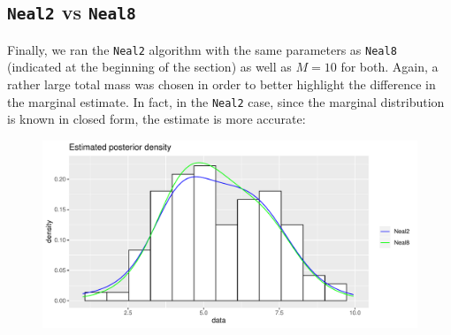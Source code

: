 \subsection{\texttt{Neal2} vs \texttt{Neal8}}
Finally, we ran the \verb|Neal2| algorithm with the same parameters as \verb|Neal8| (indicated at the beginning of the section) as well as $M=10$ for both.
Again, a rather large total mass was chosen in order to better highlight the difference in the marginal estimate.
In fact, in the \verb|Neal2| case, since the marginal distribution is known in closed form, the estimate is more accurate:
\begin{figure}[h]
	\centering
	\includegraphics[scale=0.7]{etc/neal2_M10.pdf}
\end{figure}



